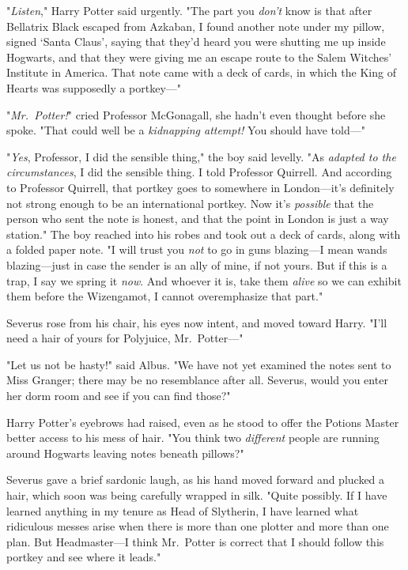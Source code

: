 "\emph{Listen}," Harry Potter said urgently. "The part you \emph{don't} know is
that after Bellatrix Black escaped from Azkaban, I found another note under my
pillow, signed `Santa Claus', saying that they'd heard you were shutting me up
inside Hogwarts, and that they were giving me an escape route to the Salem
Witches' Institute in America. That note came with a deck of cards, in which
the King of Hearts was supposedly a portkey---"

"\emph{Mr.~Potter!}" cried Professor McGonagall, she hadn't even thought before
she spoke. "That could well be a \emph{kidnapping attempt!} You should have
told---"

"\emph{Yes}, Professor, I did the sensible thing," the boy said levelly. "As
\emph{adapted to the circumstances}, I did the sensible thing. I told Professor
Quirrell. And according to Professor Quirrell, that portkey goes to somewhere
in London---it's definitely not strong enough to be an international portkey.
Now it's \emph{possible} that the person who sent the note is honest, and that
the point in London is just a way station." The boy reached into his robes and
took out a deck of cards, along with a folded paper note. "I will trust you
\emph{not} to go in guns blazing---I mean wands blazing---just in case the
sender is an ally of mine, if not yours. But if this is a trap, I say we spring
it \emph{now}. And whoever it is, take them \emph{alive} so we can exhibit them
before the Wizengamot, I cannot overemphasize that part."

Severus rose from his chair, his eyes now intent, and moved toward Harry. "I'll
need a hair of yours for Polyjuice, Mr.~Potter---"

"Let us not be hasty!" said Albus. "We have not yet examined the notes sent to
Miss Granger; there may be no resemblance after all. Severus, would you enter
her dorm room and see if you can find those?"

Harry Potter's eyebrows had raised, even as he stood to offer the Potions
Master better access to his mess of hair. "You think two \emph{different}
people are running around Hogwarts leaving notes beneath pillows?"

Severus gave a brief sardonic laugh, as his hand moved forward and plucked a
hair, which soon was being carefully wrapped in silk. "Quite possibly. If I
have learned anything in my tenure as Head of Slytherin, I have learned what
ridiculous messes arise when there is more than one plotter and more than one
plan. But Headmaster---I think Mr.~Potter is correct that I should follow this
portkey and see where it leads."

